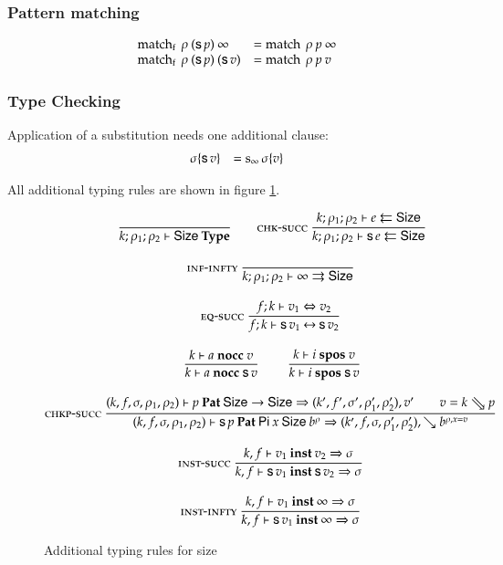 \subsubsection{Pattern matching}
\[
\begin{array}{ll}
\operatorname{match_f} \: \rho \: (\mathsf{s}\, p) \: \infty & = \operatorname{match} \: \rho \: p \: \infty \\
\operatorname{match_f} \: \rho \: (\mathsf{s}\, p) \: (\mathsf{s}\, v) & = \operatorname{match} \: \rho \: p \: v \\
\end{array}
\]

\subsubsection{Type Checking}

Application of a substitution needs one additional clause:
\[
\begin{array}{ll}
\sigma\{\mathsf{s}\, v\} & = \operatorname{s_{\infty}} \sigma\{v\} \\
\end{array}
\]

All additional typing rules are shown in figure \ref{str}.
\begin{figure}
\begin{gather*}
\nru{}{}{\IsType{k}{\rho_1}{\rho_2}{\Size}}
\qquad
\nru{\chksucc}
{\Check{k}{\rho_1}{\rho_2}{e}{\Size}}
{\Check{k}{\rho_1}{\rho_2}{\s e}{\Size}} 
\\[2ex]
\nru{\infinfty}{}{\Infer{k}{\rho_1}{\rho_2}{\infty}{\Size}} 
\\[2ex]
\nru{\eqsuc}
{\EqVal{f}{k}{v_1}{v_2}}
{\FeqVal{f}{k}{\s v_1}{\s v_2}}
\\[2ex]
\nru{}
{\nocc{k}{a}{v}}
{\nocc{k}{a}{\s v}}
\qquad
\nru{}
{\spos{k}{i}{v}}
{\spos{k}{i}{\s v}}
\\[2ex]
\nru{\chkpsucc}
{
\checkp{k,f,\sigma,\rho_1,\rho_2}{p}{\Size \ra \Size}
{k',f',\sigma',\rho'_1,\rho'_2}{v'} \qquad
v = \ptv{k}{p} }
{
\checkp
{k,f,\sigma,\rho_1,\rho_2}
{\s p}
{\vpi \: x \: \Size \: \cl{b}{\rho}}
{k',f,\sigma,\rho'_1,\rho'_2}{\wh \cl{b}{\ins{\rho}{x}{v}}}}
\\[2ex]
\nru{\unifys}
{\unify{k}{f}{v_1}{v_2}{\sigma}}
{\unify{k}{f}{\s v_1}{\s v_2}{\sigma}
}
\\[2ex]
\nru{\unifyi}
{\unify{k}{f}{v_1}{\infty}{\sigma}}
{\unify{k}{f}{\s v_1}{\infty}{\sigma}
}
\end{gather*}
\label{str}
\caption{Additional typing rules for size}
\end{figure}

